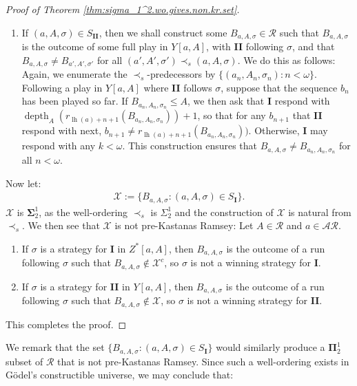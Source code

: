 \documentclass[11pt,reqno]{amsart}
\theoremstyle{plain}
\numberwithin{equation}{section}
\theoremstyle{definition}
\newcommand{\func}{\operatorname}
\newcommand{\cal}{\mathcal}
\newcommand{\X}{\cal{X}}
\newcommand{\lh}{\func{lh}}
\newcommand{\depth}{\func{depth}}
\begin{document}
\begin{proof}[Proof of Theorem \ref{thm:sigma_1^2.wo.gives.non.kr.set}]
\begin{enumerate}
        \item If $(a,A,\sigma) \in S_\textbf{II}$, then we shall construct some $B_{a,A,\sigma} \in \cal{R}$ such that $B_{a,A,\sigma}$ is the outcome of some full play in $Y[a,A]$, with \textbf{II} following $\sigma$, and that $B_{a,A,\sigma} \neq B_{a',A',\sigma'}$ for all $(a',A',\sigma') \prec_s (a,A,\sigma)$. We do this as follows: Again, we enumerate the $\prec_s$-predecessors by $\{(a_n,A_n,\sigma_n) : n < \omega\}$. Following a play in $Y[a,A]$ where \textbf{II} follows $\sigma$, suppose that the sequence $b_n$ has been played so far. If $B_{a_n,A_n,\sigma_n} \leq A$, we then ask that \textbf{I} respond with $\depth_A(r_{\lh(a)+n+1}(B_{a_n,A_n,\sigma_n})) + 1$, so that for any $b_{n+1}$ that \textbf{II} respond with next, $b_{n+1} \neq r_{\lh(a)+n+1}(B_{a_n,A_n,\sigma_n}))$. Otherwise, \textbf{I} may respond with any $k < \omega$. This construction ensures that $B_{a,A,\sigma} \neq B_{a_n,A_n,\sigma_n}$ for all $n < \omega$.
    \end{enumerate}
    Now let:
    \begin{align*}
        \X := \{B_{a,A,\sigma} : (a,A,\sigma) \in S_\textbf{I}\}.
    \end{align*}
    $\X$ is $\mathbf{\Sigma}_2^1$, as the well-ordering $\prec_s$ is $\Sigma_2^1$ and the construction of $\X$ is natural from $\prec_s$. We then see that $\X$ is not pre-Kastanas Ramsey: Let $A \in \cal{R}$ and $a \in \cal{AR}$.
    \begin{enumerate}
        \item If $\sigma$ is a strategy for \textbf{I} in $Z^*[a,A]$, then $B_{a,A,\sigma}$ is the outcome of a run following $\sigma$ such that $B_{a,A,\sigma} \notin \X^c$, so $\sigma$ is not a winning strategy for \textbf{I}.

        \item If $\sigma$ is a strategy for \textbf{II} in $Y[a,A]$, then $B_{a,A,\sigma}$ is the outcome of a run following $\sigma$ such that $B_{a,A,\sigma} \notin \X$, so $\sigma$ is not a winning strategy for \textbf{II}.
    \end{enumerate}
    This completes the proof.
\end{proof}

We remark that the set $\{B_{a,A,\sigma} : (a,A,\sigma) \in S_\textbf{I}\}$ would similarly produce a $\mathbf{\Pi}_2^1$ subset of $\cal{R}$ that is not pre-Kastanas Ramsey. Since such a well-ordering exists in G\"{o}del's constructible universe, we may conclude that:
\end{document}
